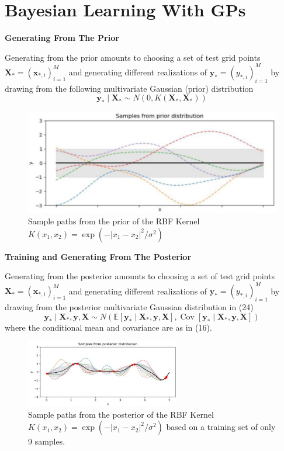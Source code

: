 \documentclass[11pt]{article}
\theoremstyle{plain} %
\theoremstyle{remark}
\begin{document}
\section{Bayesian Learning With GPs}
\textbf{Generating From The Prior}

Generating from the prior amounts to choosing a set of test grid points
$\mathbf{X}_{*}=\left(\mathbf{x}_{*, i}\right)_{i=1}^{M}$ and generating
different realizations of $\mathbf{y}_{*}=\left(y_{*, i}\right)_{i=1}^{M}$ by
drawing from the following multivariate Gaussian (prior) distribution
$$
  \mathbf{y}_{*} \mid \mathbf{X}_{*} \sim N\left(0, K\left(\mathbf{X}_{*}, \mathbf{X}_{*}\right)\right)
$$

\begin{figure}[!htp]
  \centering
  \includegraphics[width=.6\textwidth]{images/2023_11_26_5b299dbd302e8f129737g-23}
  \caption{Sample paths from the prior of the RBF Kernel $K\left(x_{1},
      x_{2}\right)=\exp \left(-\left|x_{1}-x_{2}\right|^{2} /
      \sigma^{2}\right)$}
  \label{fig:RBF Kernel prior}
\end{figure}

\textbf{Training and Generating From The Posterior}

Generating from the posterior amounts to choosing a set of test grid points
$\mathbf{X}_{*}=\left(\mathbf{x}_{*, i}\right)_{i=1}^{M}$ and generating
different realizations of $\mathbf{y}_{*}=\left(y_{*, i}\right)_{i=1}^{M}$ by
drawing from the posterior multivariate Gaussian distribution in (24)
$$
  \mathbf{y}_{*} \mid \mathbf{X}_{*}, \mathbf{y}, \mathbf{X} \sim N\left(\mathbb{E}\left[\mathbf{y}_{*} \mid \mathbf{X}_{*}, \mathbf{y}, \mathbf{X}\right], \operatorname{Cov}\left[\mathbf{y}_{*} \mid \mathbf{X}_{*}, \mathbf{y}, \mathbf{X}\right]\right)
$$
where the conditional mean and covariance are as in (16).

\begin{figure}[!htp]
  \centering
  \includegraphics[width=0.6\textwidth]{images/2023_11_26_5b299dbd302e8f129737g-25}
  \caption{Sample paths from the posterior of the RBF Kernel $K\left(x_{1}, x_{2}\right)=\exp \left(-\left|x_{1}-x_{2}\right|^{2} /
      \sigma^{2}\right)$ based on a training set of only 9 samples.}
  \label{fig:RBF Kernel posterior}
\end{figure}
\end{document}
